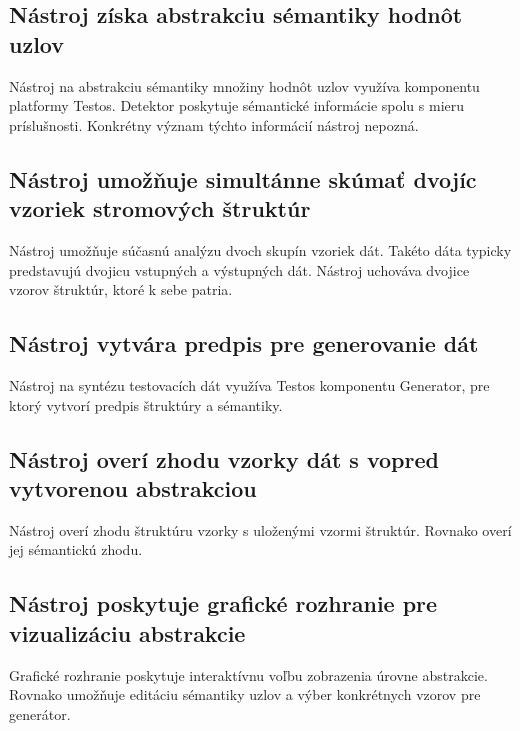 \subsection*{Nástroj získa abstrakciu sémantiky hodnôt uzlov}
Nástroj na abstrakciu sémantiky množiny hodnôt uzlov využíva komponentu platformy Testos. Detektor poskytuje sémantické informácie spolu s mieru príslušnosti.  Konkrétny význam týchto informácií nástroj nepozná.
\subsection*{Nástroj umožňuje simultánne skúmať dvojíc vzoriek stromových štruktúr}
Nástroj umožňuje súčasnú analýzu dvoch skupín vzoriek dát. Takéto dáta typicky predstavujú dvojicu vstupných a výstupných dát. Nástroj uchováva dvojice vzorov štruktúr, ktoré k sebe patria. 
\subsection*{Nástroj vytvára predpis pre generovanie dát}
Nástroj na syntézu testovacích dát využíva Testos komponentu Generator, pre ktorý vytvorí predpis štruktúry a sémantiky.
\subsection*{Nástroj overí zhodu vzorky dát s vopred vytvorenou abstrakciou}
Nástroj overí zhodu štruktúru vzorky s uloženými vzormi štruktúr. Rovnako overí jej sémantickú zhodu. 
\subsection*{Nástroj poskytuje grafické rozhranie pre vizualizáciu abstrakcie}
Grafické rozhranie poskytuje interaktívnu voľbu zobrazenia úrovne abstrakcie. Rovnako umožňuje editáciu sémantiky uzlov a výber konkrétnych vzorov pre generátor.  
